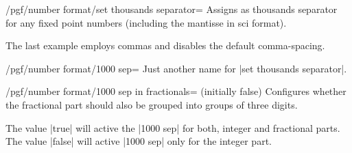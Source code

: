 \begin{key}{/pgf/number format/set thousands separator=}
Assigns  as thousands separator for any fixed point numbers (including the mantisse in sci format).

\begin{codeexample}[]
\end{codeexample}
\begin{codeexample}[]
\end{codeexample}

\begin{codeexample}[]
\end{codeexample}
\begin{codeexample}[]
\end{codeexample}
\begin{codeexample}[]
\end{codeexample}
The last example employs commas and disables the default comma-spacing. 
\end{key}
\begin{key}{/pgf/number format/1000 sep=}
	Just another name for |set thousands separator|.
\end{key}

\begin{key}{/pgf/number format/1000 sep in fractionals= (initially false)}
	Configures whether the fractional part should also be grouped into groups of three digits.

	The value |true| will active the |1000 sep| for both, integer and fractional parts. The value |false|
	will active |1000 sep| only for the integer part.
\begin{codeexample}[]
\end{codeexample}
\begin{codeexample}[]
\end{codeexample}
\end{key}


